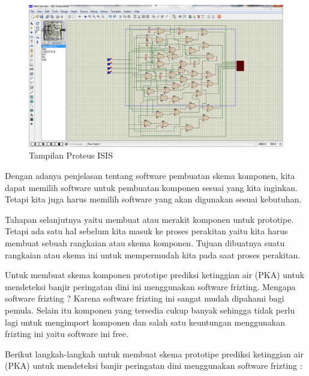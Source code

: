 \begin{enumerate}
    \begin{figure}[H]
    \centering
    \includegraphics[width=1.1\textwidth]{figures/isis3.png}
    \caption{Tampilan Proteus ISIS }
    \label{print}
    \end{figure}
\end{enumerate}
\par Dengan adanya penjelasan tentang software pembuatan skema komponen, kita dapat memilih software untuk pembuatan komponen sesuai yang kita inginkan. Tetapi kita juga harus memilih software yang akan digunakan sesuai kebutuhan.\\
\par Tahapan selanjutnya yaitu membuat atau merakit komponen untuk prototipe. Tetapi ada satu hal sebelum kita masuk ke proses perakitan yaitu kita harus membuat sebuah rangkaian atau skema komponen. Tujuan dibuatnya suatu rangkaian atau skema ini untuk mempermudah kita pada saat proses perakitan.\\
\par Untuk membuat skema komponen prototipe prediksi ketinggian air (PKA) untuk mendeteksi banjir peringatan dini ini menggunakan software frizting. Mengapa software frizting ? Karena software frizting ini sangat mudah dipahami bagi pemula. Selain itu komponen yang tersedia cukup banyak sehingga tidak perlu lagi untuk mengimport komponen dan salah satu keuntungan menggunakan frizting ini yaitu software ini free.\\
\par Berikut langkah-langkah untuk membuat skema prototipe prediksi ketinggian air (PKA) untuk mendeteksi banjir peringatan dini menggunakan software frizting :
